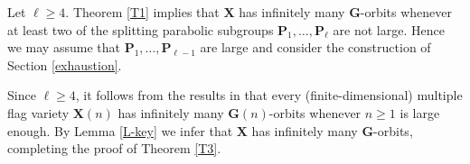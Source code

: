 \documentclass[12pt]{amsart}
\newcommand{\G}{\mathbf{G}}
\renewcommand{\P}{\mathbf{P}}
\newcommand{\X}{\mathbf{X}}
\numberwithin{equation}{section}
\theoremstyle{definition}
\begin{document}
\label{section-8}

Let $\ell\geq 4$. 
Theorem \ref{T1} implies that $\X$ has infinitely many $\G$-orbits whenever at least two of the splitting parabolic subgroups $\P_1,\ldots,\P_\ell$ are not large.
Hence we may assume that $\P_1,\ldots,\P_{\ell-1}$ are large and consider the construction of Section \ref{exhaustion}.

Since $\ell\geq 4$, it follows from the results in \cite{MWZ1,MWZ2,Matsuki1,Matsuki2} that every (finite-dimensional) multiple flag variety $\X(n)$ has infinitely many $\G(n)$-orbits whenever $n\geq 1$ is large enough. By Lemma \ref{L-key}
we infer that $\X$ has infinitely many $\G$-orbits, completing the proof of Theorem \ref{T3}.
\end{document}
